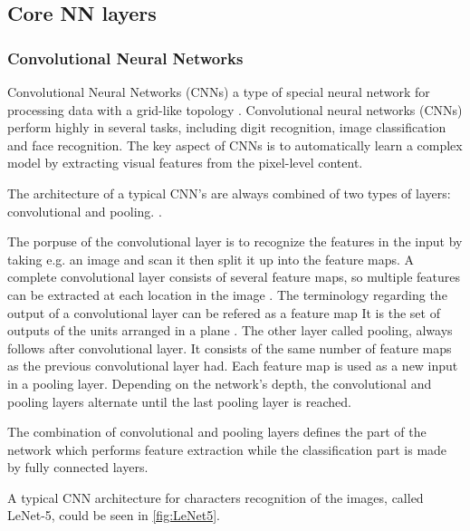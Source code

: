 \subsection{Core NN layers}
\subsubsection{Convolutional Neural Networks}
Convolutional Neural Networks (CNNs) a type of special neural network for processing data with a grid-like topology \citep{Goodfellow2016}. Convolutional neural networks (CNNs) perform highly in several tasks, including digit recognition, image classification and face recognition. The key aspect of CNNs is to automatically learn a complex model by extracting visual features from the pixel-level content.\citep{Acquarelli2017,LeCun1998}

The architecture of a typical CNN’s are always combined of two types of layers: convolutional and pooling. \citep{Goodfellow2016, LeCun2015}. 

The porpuse of the convolutional layer is to recognize the features in the input by taking e.g. an image and scan it then split it up into the feature maps. A complete convolutional layer consists of several feature maps, so multiple features can be extracted at each location in the image \citep{LeCun1998}. The terminology regarding the output of a convolutional layer can be refered as a feature map \citep{Goodfellow2016,LeCun1998} It is the set of outputs of the units arranged in a plane \citep{LeCun1998}. 
The other layer called pooling, always follows after convolutional layer. It consists of the same number of feature maps as the previous convolutional layer had. Each feature map is used as a new input in a pooling layer. Depending on the network's depth, the convolutional and pooling layers alternate until the last pooling layer is reached. 

The combination of convolutional and pooling layers defines the part of the network which performs feature extraction while the classification part is made by fully connected layers. 

A typical CNN architecture for characters recognition of the images, called LeNet-5, could be seen in \autoref{fig:LeNet5}.


%
 
